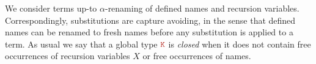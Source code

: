 We consider terms up-to $\alpha$-renaming of defined names and
recursion variables.
%
Correspondingly, substitutions are capture avoiding, in the sense that
defined names can be renamed to fresh names before any substitution is
applied to a term.
%
As usual we say that a global type $\aK$ is \emph{closed} when it does
not contain free occurrences of recursion variables $X$ or free
occurrences of names.%


  
